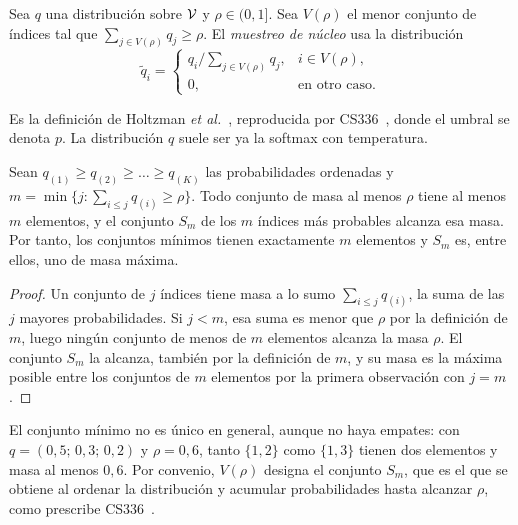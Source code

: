 \begin{definicion}\label{def:topp}
Sea $q$ una distribución sobre $\mathcal{V}$ y $\rho\in(0,1]$. Sea $V(\rho)$ el menor conjunto de índices tal que $\sum_{j\in V(\rho)}q_j\ge\rho$. El \emph{muestreo de núcleo} usa la distribución
\[
\tilde q_i=\begin{cases} q_i\big/\sum_{j\in V(\rho)}q_j, & i\in V(\rho),\\ 0, & \text{en otro caso}.\end{cases}
\]
\end{definicion}

Es la definición de Holtzman \emph{et al.}~\cite[§3.1, ecuaciones~(2) y~(3)]{holtzman}, reproducida por CS336~\cite[§6, ecuación~(24)]{cs336}, donde el umbral se denota $p$. La distribución $q$ suele ser ya la softmax con temperatura.

\begin{proposicion}\label{prop:nucleo}
Sean $q_{(1)}\ge q_{(2)}\ge\dots\ge q_{(K)}$ las probabilidades ordenadas y $m=\min\{j:\sum_{i\le j}q_{(i)}\ge\rho\}$. Todo conjunto de masa al menos $\rho$ tiene al menos $m$ elementos, y el conjunto $S_m$ de los $m$ índices más probables alcanza esa masa. Por tanto, los conjuntos mínimos tienen exactamente $m$ elementos y $S_m$ es, entre ellos, uno de masa máxima.
\end{proposicion}

\begin{proof}
Un conjunto de $j$ índices tiene masa a lo sumo $\sum_{i\le j}q_{(i)}$, la suma de las $j$ mayores probabilidades. Si $j<m$, esa suma es menor que $\rho$ por la definición de $m$, luego ningún conjunto de menos de $m$ elementos alcanza la masa $\rho$. El conjunto $S_m$ la alcanza, también por la definición de $m$, y su masa es la máxima posible entre los conjuntos de $m$ elementos por la primera observación con $j=m$.
\end{proof}

\begin{observacion}\label{obs:nucleo}
El conjunto mínimo no es único en general, aunque no haya empates: con $q=(0{,}5;\allowbreak\,0{,}3;\allowbreak\,0{,}2)$ y $\rho=0{,}6$, tanto $\{1,2\}$ como $\{1,3\}$ tienen dos elementos y masa al menos $0{,}6$. Por convenio, $V(\rho)$ designa el conjunto $S_m$, que es el que se obtiene al ordenar la distribución y acumular probabilidades hasta alcanzar $\rho$, como prescribe CS336~\cite[§6]{cs336}.
\end{observacion}

